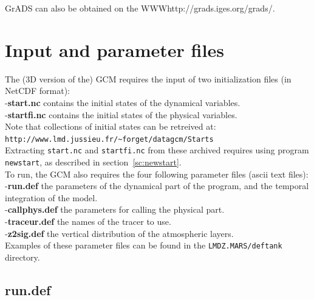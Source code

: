 GrADS can also be obtained on the {WWW}{http://grads.iges.org/grads/}.

\section{Input and parameter files}

\label{loc:entrees}

The (3D version of the) GCM requires
the input of two initialization files (in NetCDF format):\\
-{\bf start.nc}
contains the initial states of the dynamical variables.\\
-{\bf startfi.nc}
contains the initial states of the physical variables.\\
Note that collections of initial states can be retreived at:\\
\verb+http://www.lmd.jussieu.fr/~forget/datagcm/Starts+ \\
Extracting {\tt start.nc} and {\tt startfi.nc} from these archived
requires using program {\tt newstart}, as described in
section~\ref{sc:newstart}.\\

\noindent
To run, the GCM also requires the  four following
parameter files (ascii text files):\\
-{\bf run.def} the parameters of the dynamical part of the program,
and the temporal integration of the model.\\
-{\bf callphys.def} the parameters for calling the physical part.\\
-{\bf traceur.def} the names of the tracer to use.\\
-{\bf z2sig.def}
 the vertical distribution of the atmospheric layers.\\
Examples of these parameter files can be found in the
\verb+LMDZ.MARS/deftank+ directory.

\subsection{run.def}
\label{vb:run.def}

